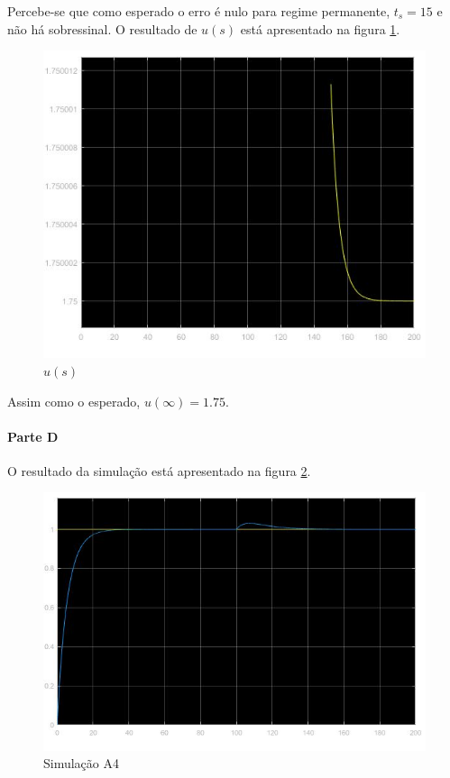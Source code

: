 \documentclass[
]{book}
\theoremstyle{definition}
\theoremstyle{definition}
\theoremstyle{definition}
\theoremstyle{remark}
\begin{document}
Percebe-se que como esperado o erro é nulo para regime permanente, \(t_s = 15\) e não há sobressinal. O resultado de \(u(s)\) está apresentado na figura \ref{fig:prob1C2}.

\begin{figure}

{\centering \includegraphics[width=0.8\linewidth]{Imagens/Lab5/Resolução/prob1C2} 

}

\caption{$u(s)$}\label{fig:prob1C2}
\end{figure}

Assim como o esperado, \(u(\infty) =1.75\).

\hypertarget{parte-d-2}{%
\paragraph{Parte D}\label{parte-d-2}}

O resultado da simulação está apresentado na figura \ref{fig:prob1D1}.

\begin{figure}

{\centering \includegraphics[width=0.8\linewidth]{Imagens/Lab5/Resolução/prob1D1} 

}

\caption{Simulação A4}\label{fig:prob1D1}
\end{figure}
\end{document}
